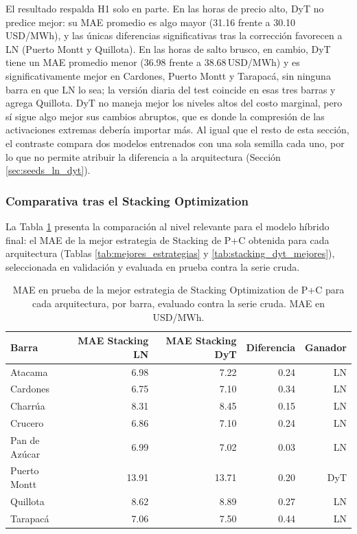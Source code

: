 El resultado respalda H1 solo en parte. En las horas de precio alto, DyT no predice mejor: su MAE promedio es algo mayor (31.16 frente a 30.10\,USD/MWh), y las únicas diferencias significativas tras la corrección favorecen a LN (Puerto Montt y Quillota). En las horas de salto brusco, en cambio, DyT tiene un MAE promedio menor (36.98 frente a 38.68\,USD/MWh) y es significativamente mejor en Cardones, Puerto Montt y Tarapacá, sin ninguna barra en que LN lo sea; la versión diaria del test coincide en esas tres barras y agrega Quillota. DyT no maneja mejor los niveles altos del costo marginal, pero sí sigue algo mejor sus cambios abruptos, que es donde la compresión de las activaciones extremas debería importar más. Al igual que el resto de esta sección, el contraste compara dos modelos entrenados con una sola semilla cada uno, por lo que no permite atribuir la diferencia a la arquitectura (Sección \ref{sec:seeds_ln_dyt}).

\subsubsection{Comparativa tras el Stacking Optimization}

La Tabla \ref{tab:comparativa_stacking} presenta la comparación al nivel relevante para el modelo híbrido final: el MAE de la mejor estrategia de Stacking de P+C obtenida para cada arquitectura (Tablas \ref{tab:mejores_estrategias} y \ref{tab:stacking_dyt_mejores}), seleccionada en validación y evaluada en prueba contra la serie cruda.

\begin{table}[htbp]
    \centering
    \small
    \begin{tabular}{lrrrr}
        \toprule
        Barra & MAE Stacking LN & MAE Stacking DyT & Diferencia & Ganador \\
        \midrule
        Atacama       & 6.98  & 7.22  & 0.24 & LN  \\
        Cardones      & 6.75  & 7.10  & 0.34 & LN  \\
        Charrúa       & 8.31  & 8.45  & 0.15 & LN  \\
        Crucero       & 6.86  & 7.10  & 0.24 & LN  \\
        Pan de Azúcar & 6.99  & 7.02  & 0.03 & LN  \\
        Puerto Montt  & 13.91  & 13.71  & 0.20 & DyT \\
        Quillota      & 8.62  & 8.89  & 0.27 & LN  \\
        Tarapacá      & 7.06  & 7.50  & 0.44 & LN  \\
        \bottomrule
    \end{tabular}
    \vspace{0.2cm}
    \caption{MAE en prueba de la mejor estrategia de Stacking Optimization de P+C para cada arquitectura, por barra, evaluado contra la serie cruda. MAE en USD/MWh.}
    \label{tab:comparativa_stacking}
\end{table}

